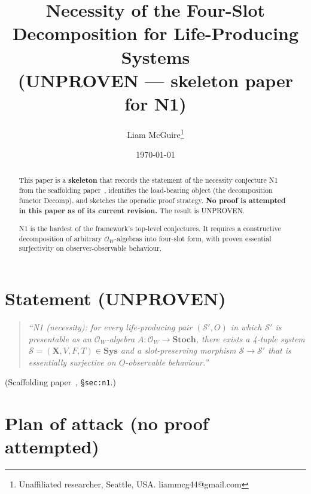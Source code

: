 \documentclass[11pt]{article}
\title{Necessity of the Four-Slot Decomposition for Life-Producing Systems \\
       \large (UNPROVEN --- skeleton paper for N1)}
\author{Liam McGuire\thanks{Unaffiliated researcher, Seattle, USA. liammcg44@gmail.com}}
\date{\today}
\theoremstyle{plain}
\theoremstyle{definition}
\newcommand{\X}{\mathbf{X}}
\begin{document}
\maketitle

\begin{abstract}
This paper is a \textbf{skeleton} that records the statement of the
necessity conjecture N1 from the scaffolding
paper~\cite{emergent_systems_2026}, identifies the load-bearing
object (the decomposition functor $\mathrm{Decomp}$), and sketches the
operadic proof strategy. \textbf{No proof is attempted in this paper
as of its current revision.} The result is UNPROVEN.

N1 is the hardest of the framework's top-level conjectures. It
requires a constructive decomposition of arbitrary
$\mathcal{O}_W$-algebras into four-slot form, with proven essential
surjectivity on observer-observable behaviour.
\end{abstract}

\section{Statement (UNPROVEN)}

\begin{quote}
\emph{``N1 (necessity): for every life-producing pair
$(\mathcal{S}', O)$ in which $\mathcal{S}'$ is presentable as an
$\mathcal{O}_W$-algebra $A: \mathcal{O}_W \to \mathbf{Stoch}$,
there exists a 4-tuple system $\mathcal{S} = (\X, V, F, T)
\in \mathbf{Sys}$ and a slot-preserving morphism
$\mathcal{S} \to \mathcal{S}'$ that is essentially surjective on
$O$-observable behaviour.''}
\end{quote}
\noindent (Scaffolding paper~\cite{emergent_systems_2026},
\S\texttt{sec:n1}.)

\section{Plan of attack (no proof attempted)}
\end{document}
